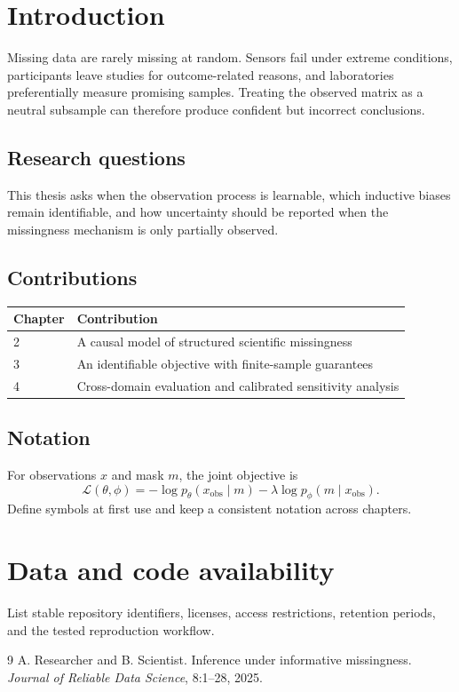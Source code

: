 \documentclass[11pt,twoside,openany,headings=small]{scrbook}
\begin{document}
\tableofcontents

\mainmatter
\chapter{Introduction}
Missing data are rarely missing at random. Sensors fail under extreme
conditions, participants leave studies for outcome-related reasons, and
laboratories preferentially measure promising samples. Treating the observed
matrix as a neutral subsample can therefore produce confident but incorrect
conclusions.

\section{Research questions}
This thesis asks when the observation process is learnable, which inductive
biases remain identifiable, and how uncertainty should be reported when the
missingness mechanism is only partially observed.

\section{Contributions}
\begin{table}[h]
\centering
\begin{tabular}{@{}p{}p{}@{}}
\toprule
Chapter & Contribution \\
\midrule
2 & A causal model of structured scientific missingness \\
3 & An identifiable objective with finite-sample guarantees \\
4 & Cross-domain evaluation and calibrated sensitivity analysis \\
\bottomrule
\end{tabular}
\end{table}

\section{Notation}
For observations $x$ and mask $m$, the joint objective is
\begin{equation}
  \mathcal{L}(\theta,\phi)
  = -\log p_{\theta}(x_{\mathrm{obs}}\mid m)
    -\lambda\log p_{\phi}(m\mid x_{\mathrm{obs}}).
\end{equation}
Define symbols at first use and keep a consistent notation across chapters.

\backmatter
\chapter*{Data and code availability}
List stable repository identifiers, licenses, access restrictions, retention
periods, and the tested reproduction workflow.

\begin{thebibliography}{9}
 A. Researcher and B. Scientist.
Inference under informative missingness.
\textit{Journal of Reliable Data Science}, 8:1--28, 2025.
\end{thebibliography}
\end{document}
